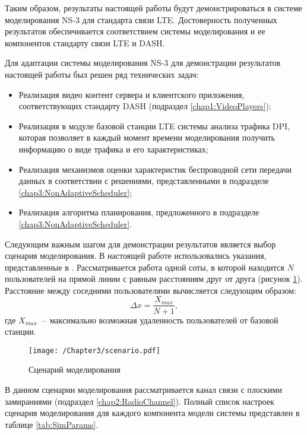 Таким образом, результаты настоящей работы будут демонстрироваться в системе моделирования NS-3 для стандарта связи LTE. Достоверность полученных результатов обеспечивается соответствием системы моделирования и ее компонентов стандарту связи LTE и DASH.

Для адаптации системы моделирования NS-3 для демонстрации результатов настоящей работы был решен ряд технических задач:
\begin{itemize}
	\item Реализация видео контент сервера и клиентского приложения, соответствующих стандарту DASH (подраздел \ref{chap1:VideoPlayers});
	\item Реализация в модуле базовой станции LTE системы анализа трафика DPI, которая позволяет в каждый момент времени моделирования получить информацию о виде трафика и его характеристиках;
	\item Реализация механизмов оценки характеристик беспроводной сети передачи данных в соответствии с решениями, представленными в подразделе \ref{chap3:NonAdaptiveScheduler};
	\item Реализация алгоритма планирования, предложенного в подразделе \ref{chap3:NonAdaptiveScheduler}.
\end{itemize}

Следующим важным шагом для демонстрации результатов является выбор сценария моделирования. В настоящей работе использовались указания, представленные в \cite{simulation}. Рассматривается работа одной соты, в которой находится $N$ пользователей на прямой линии с равным расстояниям друг от друга (рисунок \ref{fig:scenario}). Расстояние между соседними пользователями вычисляется следующим образом:
$$\Delta x = \frac{X_{max}}{N+1},$$
где $X_{max}$~--~максимально возможная удаленность пользователей от базовой станции.

\begin{figure}[htbp]
\begin{center}
\texttt{[image: /Chapter3/scenario.pdf]}
\caption{Сценарий моделирования}
\label{fig:scenario}
\end{center}
\end{figure}

В данном сценарии моделирования рассматривается канал связи с плоскими замираниями (подраздел \ref{chap2:RadioChannel}). %
Полный список настроек сценария моделирования для каждого компонента модели системы представлен в таблице \ref{tab:SimParams}.

